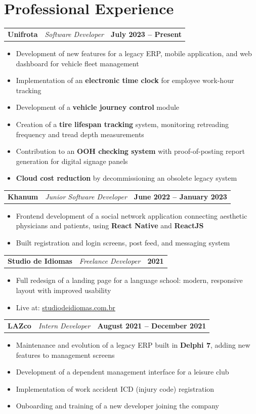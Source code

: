 \documentclass[a4paper,11pt]{article}
\makeatletter
\newenvironment{joblong}[3]
    {
    \begin{tabularx}{\linewidth}{@{}l X r@{}}
    \textbf{\color{darkblue}#1} & \hfill \textit{\small\color{medgray}#3} & \textbf{\small #2} \\[2pt]
    \end{tabularx}
    \begin{minipage}[t]{\linewidth}
    \begin{itemize}[nosep,after=\strut, leftmargin=1.2em, itemsep=3pt,label={\small\color{darkblue}$\bullet$}]
    }
    {
    \end{itemize}
    \end{minipage}
    \vspace{4pt}
    }
\makeatother
\begin{document}
\section{Professional Experience}

\begin{joblong}{Unifrota}{July 2023 -- Present}{Software Developer}
\item Development of new features for a legacy ERP, mobile application, and web dashboard for vehicle fleet management
\item Implementation of an \textbf{electronic time clock} for employee work-hour tracking
\item Development of a \textbf{vehicle journey control} module
\item Creation of a \textbf{tire lifespan tracking} system, monitoring retreading frequency and tread depth measurements
\item Contribution to an \textbf{OOH checking system} with proof-of-posting report generation for digital signage panels
\item \textbf{Cloud cost reduction} by decommissioning an obsolete legacy system
\end{joblong}

\begin{joblong}{Khanum}{June 2022 -- January 2023}{Junior Software Developer}
\item Frontend development of a social network application connecting aesthetic physicians and patients, using \textbf{React Native} and \textbf{ReactJS}
\item Built registration and login screens, post feed, and messaging system
\end{joblong}

\begin{joblong}{Studio de Idiomas}{2021}{Freelance Developer}
\item Full redesign of a landing page for a language school: modern, responsive layout with improved usability
\item Live at: \href{http://studiodeidiomas.com.br/}{studiodeidiomas.com.br}
\end{joblong}

\begin{joblong}{LAZco}{August 2021 -- December 2021}{Intern Developer}
\item Maintenance and evolution of a legacy ERP built in \textbf{Delphi 7}, adding new features to management screens
\item Development of a dependent management interface for a leisure club
\item Implementation of work accident ICD (injury code) registration
\item Onboarding and training of a new developer joining the company
\end{joblong}
\end{document}
